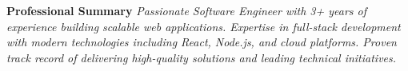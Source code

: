 
\begin{center}
    \colorbox{backgroundgray}{
        \begin{minipage}{0.95\textwidth}
            \centering
            \vspace{6pt}
            \textbf{\color{primaryblue}Professional Summary}
            \vspace{3pt}
            \textit{\color{textgray}Passionate Software Engineer with 3+ years of experience building scalable web applications. 
            Expertise in full-stack development with modern technologies including React, Node.js, and cloud platforms. 
            Proven track record of delivering high-quality solutions and leading technical initiatives.}
            \vspace{6pt}
        \end{minipage}
    }
\end{center}
\vspace{6pt} 
